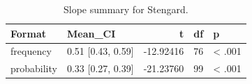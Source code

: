 \begin{table}
\centering
\caption{Slope summary for Stengard.}
\centering
\fontsize{10}{12}\selectfont
\begin{tabular}[t]{llrrl}
\toprule
Format & Mean\_CI & t & df & p\\
\midrule
frequency & 0.51 [0.43, 0.59] & -12.92416 & 76 & < .001\\
probability & 0.33 [0.27, 0.39] & -21.23760 & 99 & < .001\\
\bottomrule
\end{tabular}
\end{table}
